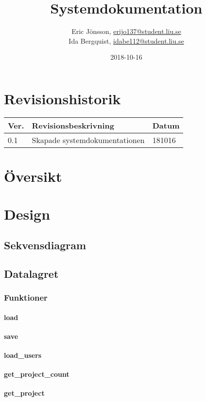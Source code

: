 \documentclass{TDP003mall}
\author{Eric Jönsson, \url{erijo137@student.liu.se}\\
  Ida Bergquist, \url{idabe112@student.liu.se}}
\title{Systemdokumentation}
\date{2018-10-16}
\begin{document}
\projectpage
\tableofcontents
\newpage
\section{Revisionshistorik}
\begin{table}[!h]
\begin{tabularx}{\linewidth}{|l|X|l|}
\hline
\textbf{Ver.} & \textbf{Revisionsbeskrivning} & \textbf{Datum} \\\hline
0.1 & Skapade systemdokumentationen & 181016 \\\hline
\end{tabularx}
\end{table}

\section{Översikt}
\section{Design}
\subsection{Sekvensdiagram}

\subsection{Datalagret}

\subsubsection{Funktioner}
\paragraph{load}
\paragraph{save}
\paragraph{load\_users}
\paragraph{get\_project\_count}
\paragraph{get\_project}
\end{document}
